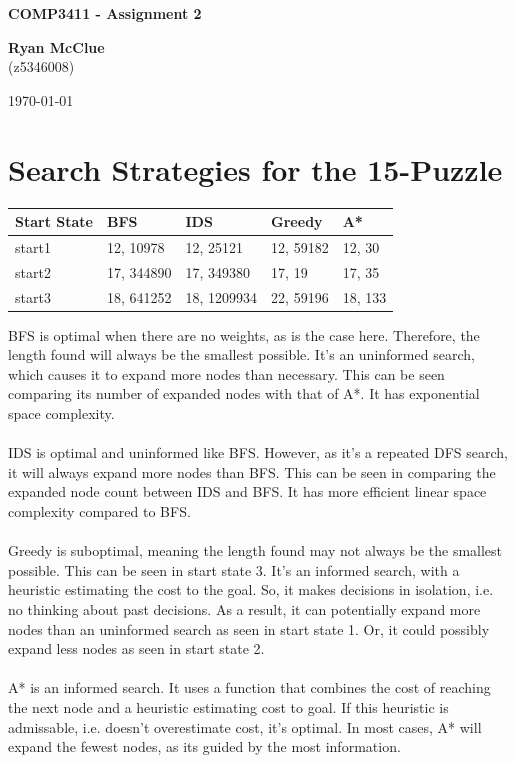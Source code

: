 \documentclass[11pt, english]{article}
\begin{document}
\thispagestyle{empty}
\begin{titlepage}
\begin{center}
  \centering
  
  \Huge \textbf{COMP3411 - Assignment 2} \\
  \vspace{5cm}
     
  \huge \textbf{Ryan McClue} \\
  (z5346008)
  \vspace{5cm}
    
  \today
\end{center}
\end{titlepage}

\section{Search Strategies for the 15-Puzzle}
\begin{table}[ht]
\centering
\begin{tabularx}{\linewidth}{X|X|X|X|X}
Start State & BFS & IDS & Greedy & A* \\\hline
start1 & 12, 10978 & 12, 25121 & 12, 59182 & 12, 30 \\
start2 & 17, 344890 & 17, 349380 & 17, 19  & 17, 35  \\
start3 & 18, 641252& 18, 1209934 & 22, 59196 & 18, 133 \\
\end{tabularx}
\end{table}
BFS is optimal when there are no weights, as is the case here.
Therefore, the length found will always be the smallest possible.
It's an uninformed search, which causes it to expand more nodes than necessary.
This can be seen comparing its number of expanded nodes with that of A*.
It has exponential space complexity.\\\\
IDS is optimal and uninformed like BFS. 
However, as it's a repeated DFS search, it will always expand more nodes than BFS.
This can be seen in comparing the expanded node count between IDS and BFS.
It has more efficient linear space complexity compared to BFS.\\\\
Greedy is suboptimal, meaning the length found may not always be the smallest possible.
This can be seen in start state 3.
It's an informed search, with a heuristic estimating the cost to the goal. 
So, it makes decisions in isolation, i.e. no thinking about past decisions.
As a result, it can potentially expand more nodes than an uninformed search as seen in start state 1.
Or, it could possibly expand less nodes as seen in start state 2.\\\\
A* is an informed search.
It uses a function that combines the cost of reaching the next node and a heuristic estimating cost to goal.
If this heuristic is admissable, i.e. doesn't overestimate cost, it's optimal.
In most cases, A* will expand the fewest nodes, as its guided by the most information.
\end{document}
